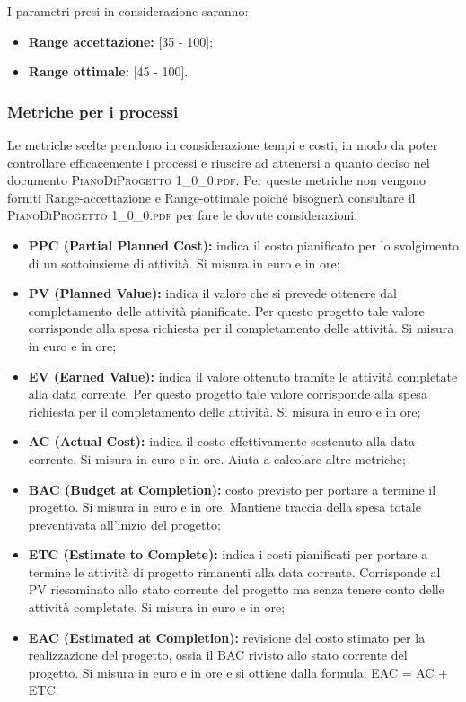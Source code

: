 		I parametri presi in considerazione saranno:
		\begin{itemize}
			\item \textbf{Range accettazione: }[35 - 100];
			\item \textbf{Range ottimale: }[45 - 100].
		\end{itemize}
		
		\subsubsection{Metriche per i processi}
		Le metriche scelte prendono in considerazione tempi e costi, in modo da poter controllare efficacemente i processi e riuscire ad attenersi a quanto deciso nel documento \textsc{PianoDiProgetto 1\_0\_0.pdf}. 
		Per queste metriche non vengono forniti Range-accettazione e Range-ottimale poiché bisognerà consultare il \textsc{PianoDiProgetto 1\_0\_0.pdf} per fare le dovute considerazioni.
		
		\begin{itemize}
			\item \textbf{PPC (Partial Planned Cost): }indica il costo pianificato per lo svolgimento di un sottoinsieme di attività. Si misura in euro e in ore;
			\item \textbf{PV (Planned Value): }indica il valore che si prevede ottenere dal completamento delle attività pianificate. Per questo progetto tale valore corrisponde alla spesa richiesta per il completamento delle attività. Si misura in euro e in ore;
			\item \textbf{EV (Earned Value): }indica il valore ottenuto tramite le attività completate alla data corrente. Per questo progetto tale valore corrisponde alla spesa richiesta per il completamento delle attività. Si misura in euro e in ore;
			\item \textbf{AC (Actual Cost): }indica il costo effettivamente sostenuto alla data corrente. Si misura in euro e in ore. Aiuta a calcolare altre metriche;
			\item \textbf{BAC (Budget at Completion): }costo previsto per portare a termine il progetto. Si misura in euro e in ore. Mantiene traccia della spesa totale preventivata all'inizio del progetto;
			\item \textbf{ETC (Estimate to Complete): }indica i costi pianificati per portare a termine le attività di progetto rimanenti alla data corrente. Corrisponde al PV riesaminato allo stato corrente del progetto ma senza tenere conto delle attività completate. Si misura in euro e in ore;
			\item \textbf{EAC (Estimated at Completion): }revisione del costo stimato per la realizzazione del progetto, ossia il BAC rivisto allo stato corrente del progetto. Si misura in euro e in ore e si ottiene dalla formula: EAC = AC + ETC.			
		\end{itemize}
	
